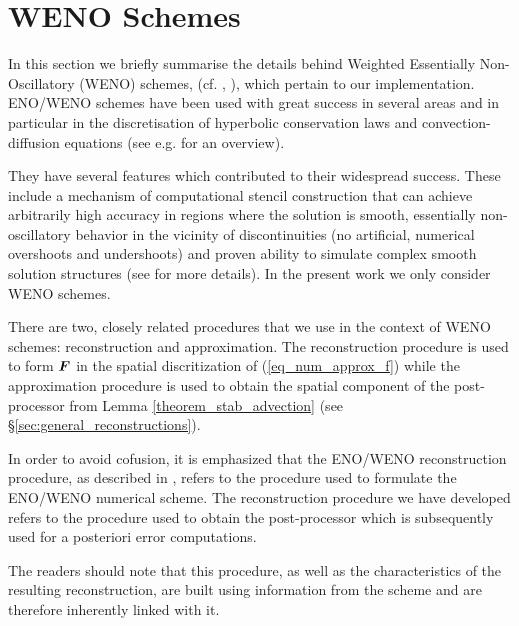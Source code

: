 \documentclass[final]{amsart}
\renewcommand{\vec}[1]{\geovec{#1}}
\numberwithin{equation}{section}
\begin{document}
\section{WENO Schemes}\label{sec:ENO_WENO_schemes}

In this section we briefly summarise the details behind Weighted Essentially Non-Oscillatory (WENO) schemes, (cf. \cite{jiang1996efficient}, \cite{shu1998essentially}), which pertain to our implementation.  ENO/WENO schemes have been used with great success in several areas and in particular in the discretisation of hyperbolic conservation laws and convection-diffusion equations (see e.g. \cite{shu2020essentially} for an overview).   

They have several features which contributed to their widespread success.  These include a mechanism of computational stencil construction that can achieve arbitrarily high accuracy in regions where the solution is smooth, essentially non-oscillatory behavior in the vicinity of discontinuities (no artificial, numerical overshoots and undershoots) and proven ability to simulate complex smooth solution structures (see \cite{shu1998essentially} for more details).  In the present work we only consider WENO schemes.

There are two, closely related procedures that we use in the context of WENO schemes: reconstruction and approximation. The reconstruction procedure is used to form $\vec{F}$ in the spatial discritization of (\ref{eq_num_approx_f}) while the approximation procedure is used to obtain the spatial component of the post-processor from Lemma \ref{theorem_stab_advection} (see \S\ref{sec:general_reconstructions}). 


\begin{Rem}
	In order to avoid cofusion, it is emphasized that the ENO/WENO reconstruction procedure, as described in \cite{shu1998essentially}, refers to the procedure  used to formulate the ENO/WENO numerical scheme.
	The reconstruction procedure we have developed refers to the procedure used to obtain the post-processor which is subsequently used for a posteriori error computations.  
	
	The readers should note that this procedure, as well as the characteristics of the resulting reconstruction,  are built using information from the scheme and are therefore inherently linked with it.
\end{Rem}
\end{document}
